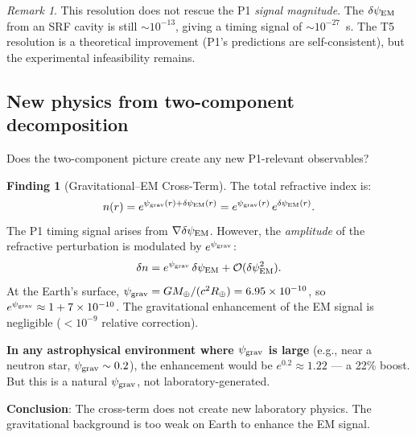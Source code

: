 \documentclass[11pt]{article}
\newcommand{\order}[1]{\mathcal{O}(#1)}
\newcommand{\ee}[1]{\times 10^{#1}}
\newcommand{\psigrav}{\psi_{\rm grav}}
\newcommand{\dpsiEM}{\delta\psi_{\rm EM}}
\theoremstyle{definition}
\newtheorem{finding}[theorem]{Finding}
\theoremstyle{remark}
\newtheorem{remark}[theorem]{Remark}
\begin{document}
\begin{remark}
This resolution does not rescue the P1 \emph{signal magnitude}. The
$\dpsiEM$ from an SRF cavity is still $\sim 10^{-13}$, giving a timing
signal of $\sim 10^{-27}$~s. The T5 resolution is a theoretical
improvement (P1's predictions are self-consistent), but the experimental
infeasibility remains.
\end{remark}

\subsection{New physics from two-component decomposition}
\label{ssec:new_physics}

Does the two-component picture create any new P1-relevant observables?

\begin{finding}[Gravitational--EM Cross-Term]
\label{find:cross_term}
The total refractive index is:
\begin{equation}
n(r) = e^{\psigrav(r) + \dpsiEM(r)} = e^{\psigrav(r)}\,e^{\dpsiEM(r)}.
\label{eq:n_total}
\end{equation}
The P1 timing signal arises from $\nabla\dpsiEM$. However, the
\emph{amplitude} of the refractive perturbation is modulated by
$e^{\psigrav}$:
\begin{equation}
\delta n = e^{\psigrav}\,\dpsiEM + \order{\dpsiEM^2}.
\label{eq:delta_n}
\end{equation}
At the Earth's surface, $\psigrav = GM_\oplus/(c^2 R_\oplus) = 6.95\ee{-10}$,
so $e^{\psigrav} \approx 1 + 7\ee{-10}$. The gravitational enhancement of
the EM signal is negligible ($< 10^{-9}$ relative correction).

\textbf{In any astrophysical environment where $\psigrav$ is large}
(e.g., near a neutron star, $\psigrav \sim 0.2$), the enhancement would be
$e^{0.2} \approx 1.22$ --- a 22\% boost. But this is a natural
$\psigrav$, not laboratory-generated.

\textbf{Conclusion}: The cross-term does not create new laboratory physics.
The gravitational background is too weak on Earth to enhance the EM signal.
\end{finding}
\end{document}
